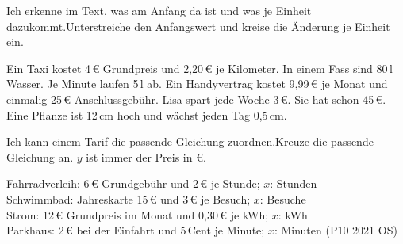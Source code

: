 \setcounter{aufgabe}{44}

\begin{aufgabe}{Ich erkenne im Text, was am Anfang da ist und was je Einheit dazukommt.\newline Unterstreiche den Anfangswert und kreise die Änderung je Einheit ein.}
\begin{teile}
\teil Ein Taxi kostet 4\,€ Grundpreis und 2,20\,€ je Kilometer.
\teil In einem Fass sind 80\,l Wasser. Je Minute laufen 5\,l ab.
\teil Ein Handyvertrag kostet 9,99\,€ je Monat und einmalig 25\,€ Anschlussgebühr.
\teil Lisa spart jede Woche 3\,€. Sie hat schon 45\,€.
\teil Eine Pflanze ist 12\,cm hoch und wächst jeden Tag 0,5\,cm.
\end{teile}
\end{aufgabe}


\begin{aufgabe}{Ich kann einem Tarif die passende Gleichung zuordnen.\newline Kreuze die passende Gleichung an. $y$ ist immer der Preis in €.}
\begin{teile}
\teil Fahrradverleih: 6\,€ Grundgebühr und 2\,€ je Stunde; $x$: Stunden \\
 \quad {} \quad {}
\teil Schwimmbad: Jahreskarte 15\,€ und 3\,€ je Besuch; $x$: Besuche \\
 \quad {} \quad {}
\teil Strom: 12\,€ Grundpreis im Monat und 0,30\,€ je kWh; $x$: kWh \\
 \quad {} \quad {}
\teil Parkhaus: 2\,€ bei der Einfahrt und 5\,Cent je Minute; $x$: Minuten (P10 2021 OS) \\
 \quad {} \quad {} \quad {}
\end{teile}
\end{aufgabe}


